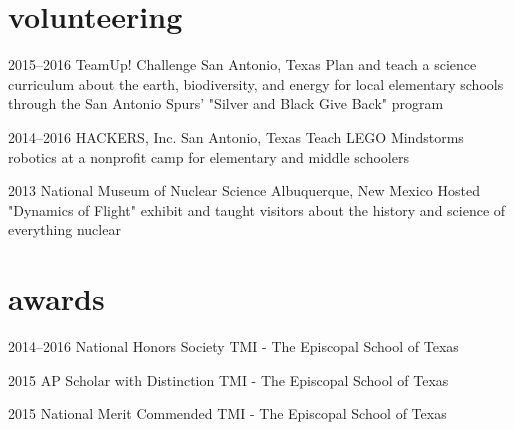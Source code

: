 \documentclass[]{friggeri-cv} %
\begin{document}
\vspace{-.5pt}


\section{volunteering}

\begin{entrylist}

	\entry
	{2015--2016}
	{TeamUp! Challenge}
	{San Antonio, Texas}
	{Plan and teach a science curriculum about the earth, biodiversity, and energy for local elementary schools through the San Antonio Spurs' "Silver and Black Give Back" program}


	\entry
	{2014--2016}
	{HACKERS, Inc.}
	{San Antonio, Texas}
	{Teach LEGO Mindstorms robotics at a nonprofit camp for elementary and middle schoolers}


	\entry
	{2013}
	{National Museum of Nuclear Science}
	{Albuquerque, New Mexico}
	{Hosted "Dynamics of Flight" exhibit and taught visitors about the history and science of everything nuclear}

\end{entrylist}

\pagebreak

\section{awards}

\begin{entrylist}

	\vspace{-10pt}
	\entry
	{2014--2016}
	{National Honors Society}
	{TMI - The Episcopal School of Texas}


	\vspace{-10pt}
	\entry
	{2015}
	{AP Scholar with Distinction}
	{TMI - The Episcopal School of Texas}


	\vspace{-10pt}
	\entry
	{2015}
	{National Merit Commended}
	{TMI - The Episcopal School of Texas}

\end{entrylist}
\end{document}
